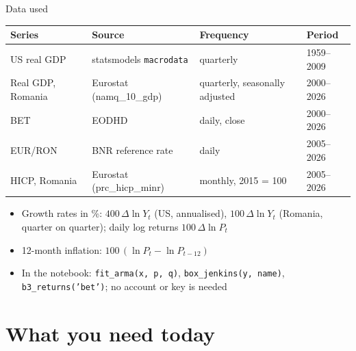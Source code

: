 \begin{frame}{Data used}
\itemsize{\small}
\begin{center}
\footnotesize
\begin{tabular}{llll}
\toprule
\textbf{Series} & \textbf{Source} & \textbf{Frequency} & \textbf{Period} \\
\midrule
US real GDP & statsmodels \texttt{macrodata} & quarterly & 1959--2009 \\
Real GDP, Romania & Eurostat (namq\_10\_gdp) & quarterly, seasonally adjusted & 2000--2026 \\
BET & EODHD & daily, close & 2000--2026 \\
EUR/RON & BNR reference rate & daily & 2005--2026 \\
HICP, Romania & Eurostat (prc\_hicp\_minr) & monthly, 2015 = 100 & 2005--2026 \\
\bottomrule
\end{tabular}
\end{center}
\begin{itemize}
    \item Growth rates in \%: $400\,\Delta\ln Y_t$ (US, annualised), $100\,\Delta\ln Y_t$ (Romania, quarter on quarter); daily log returns $100\,\Delta\ln P_t$
    \item 12-month inflation: $100\,(\ln P_t - \ln P_{t-12})$
    \item In the notebook: \texttt{fit\_arma(x, p, q)}, \texttt{box\_jenkins(y, name)}, \texttt{b3\_returns('bet')}; no account or key is needed
\end{itemize}
\end{frame}


\section{What you need today}

